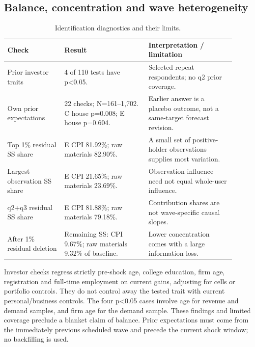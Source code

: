 \subsection{Balance, concentration and wave heterogeneity}
\begin{table}[H]
\centering
\small
\setlength{\tabcolsep}{4pt}
\caption{Identification diagnostics and their limits.}
\begin{tabular}{p{0.23\linewidth}p{0.34\linewidth}p{0.35\linewidth}}
\toprule
Check & Result & Interpretation / limitation \\
\midrule
Prior investor traits & 4 of 110 tests have p<0.05. & Selected repeat respondents; no q2 prior coverage. \\
Own prior expectations & 22 checks; N=161--1,702. C house p=0.008; E house p=0.604. & Earlier answer is a placebo outcome, not a same-target forecast revision. \\
Top 1\% residual SS share & E CPI 81.92\%; raw materials 82.90\%. & A small set of positive-holder observations supplies most variation. \\
Largest observation SS share & E CPI 21.65\%; raw materials 23.69\%. & Observation influence need not equal whole-user influence. \\
q2+q3 residual SS share & E CPI 81.88\%; raw materials 79.18\%. & Contribution shares are not wave-specific causal slopes. \\
After 1\% residual deletion & Remaining SS: CPI 9.67\%; raw materials 9.32\% of baseline. & Lower concentration comes with a large information loss. \\
\bottomrule
\end{tabular}
\end{table}
\noindent Investor checks regress strictly pre-shock age, college education, firm age, registration and full-time employment on current gains, adjusting for cells or portfolio controls. They do not control away the tested trait with current personal/business controls. The four p<0.05 cases involve age for revenue and demand samples, and firm age for the demand sample. These findings and limited coverage preclude a blanket claim of balance. Prior expectations must come from the immediately previous scheduled wave and precede the current shock window; no backfilling is used.

